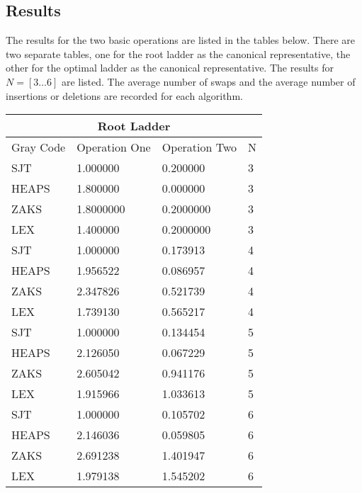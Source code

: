 \subsection{Results}

The results for the two basic operations are listed in the tables below. There are two separate tables, one 
for the root ladder as the canonical representative, the other for the optimal ladder as the canonical representative.
The results for $N=[3 \dots 6]$ are listed. The average number of swaps and the average number of insertions or deletions are 
recorded for each algorithm.

\begin{tabular}{ |p{3cm}||p{3cm}|p{3cm}|p{3cm}|}
 \hline
 \multicolumn{4}{|c|}{Root Ladder} \\
 \hline
 Gray Code& Operation One &Operation Two& N\\
 \hline
 SJT  & 1.000000 &0.200000 & 3\\
 HEAPS & 1.800000 & 0.000000 & 3 \\
 ZAKS & 1.8000000 & 0.2000000 &  3\\
 LEX & 1.400000 & 0.2000000 &  3\\
 \hline

 SJT  & 1.000000 &0.173913 & 4\\
 HEAPS & 1.956522 & 0.086957 & 4 \\
 ZAKS & 2.347826 & 0.521739 &  4\\
 LEX & 1.739130 & 0.565217 &  4\\
 \hline
 
 SJT  & 1.000000 &0.134454& 5\\
 HEAPS & 2.126050 & 0.067229 & 5 \\
 ZAKS & 2.605042 & 0.941176 &  5\\
 LEX & 1.915966 & 1.033613 &  5\\
 \hline
 
 SJT  & 1.000000 &0.105702 & 6\\
 HEAPS & 2.146036 & 0.059805 & 6\\
 ZAKS & 2.691238 & 1.401947 &  6\\
 LEX & 1.979138 & 1.545202&  6\\
 \hline
\end{tabular}\pagebreak




